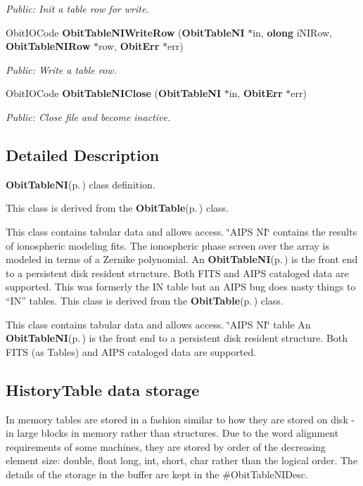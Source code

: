 \begin{CompactItemize}
\begin{CompactList}\small\item\em Public: Init a table row for write. \item\end{CompactList}\item 
Obit\-IOCode {\bf Obit\-Table\-NIWrite\-Row} ({\bf Obit\-Table\-NI} $\ast$in, {\bf olong} i\-NIRow, {\bf Obit\-Table\-NIRow} $\ast$row, {\bf Obit\-Err} $\ast$err)
\begin{CompactList}\small\item\em Public: Write a table row. \item\end{CompactList}\item 
Obit\-IOCode {\bf Obit\-Table\-NIClose} ({\bf Obit\-Table\-NI} $\ast$in, {\bf Obit\-Err} $\ast$err)
\begin{CompactList}\small\item\em Public: Close file and become inactive. \item\end{CompactList}\end{CompactItemize}


\subsection{Detailed Description}
{\bf Obit\-Table\-NI}{\rm (p.\,\pageref{structObitTableNI})} class definition. 

This class is derived from the {\bf Obit\-Table}{\rm (p.\,\pageref{structObitTable})} class.

This class contains tabular data and allows access. \char`\"{}AIPS NI\char`\"{} contains the results of ionospheric modeling fits. The ionospheric phase screen over the array is modeled in terms of a Zernike polynomial. An {\bf Obit\-Table\-NI}{\rm (p.\,\pageref{structObitTableNI})} is the front end to a persistent disk resident structure. Both FITS and AIPS cataloged data are supported. This was formerly the IN table but an AIPS bug does nasty things to ``IN'' tables. This class is derived from the {\bf Obit\-Table}{\rm (p.\,\pageref{structObitTable})} class.

This class contains tabular data and allows access. \char`\"{}AIPS NI\char`\"{} table An {\bf Obit\-Table\-NI}{\rm (p.\,\pageref{structObitTableNI})} is the front end to a persistent disk resident structure. Both FITS (as Tables) and AIPS cataloged data are supported.\subsection{History\-Table data storage}\label{ObitTableWX_8h_TableDataStorage}
In memory tables are stored in a fashion similar to how they are stored on disk - in large blocks in memory rather than structures. Due to the word alignment requirements of some machines, they are stored by order of the decreasing element size: double, float long, int, short, char rather than the logical order. The details of the storage in the buffer are kept in the \#Obit\-Table\-NIDesc.

